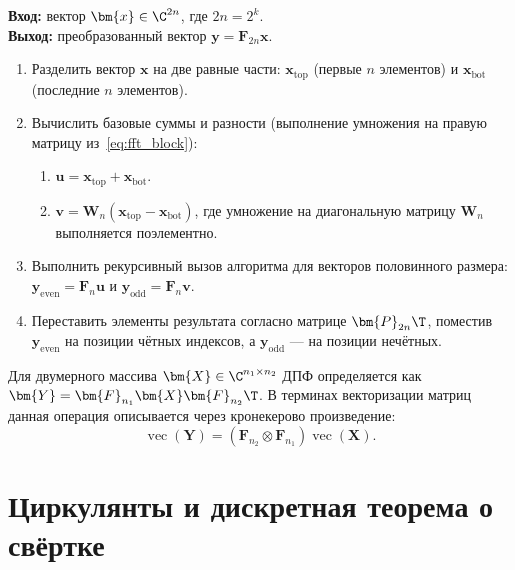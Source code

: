 \begin{tcbalgorithmbox}
\label{alg:fft}
    \textbf{Вход:} вектор $\bm{x} \in \C^{2n}$, где $2n = 2^k$.\\
    \textbf{Выход:} преобразованный вектор $\bm{y} = \bm{F}_{2n} \bm{x}$.
    \begin{enumerate}
        \item Разделить вектор $\bm{x}$ на две равные части: $\bm{x}_{\text{top}}$ (первые $n$ элементов) и $\bm{x}_{\text{bot}}$ (последние $n$ элементов).
        \item Вычислить базовые суммы и разности (выполнение умножения на правую матрицу из~\cref{eq:fft_block}):
        \begin{enumerate}
            \item $\bm{u} = \bm{x}_{\text{top}} + \bm{x}_{\text{bot}}$.
            \item $\bm{v} = \bm{W}_n (\bm{x}_{\text{top}} - \bm{x}_{\text{bot}})$, где умножение на диагональную матрицу $\bm{W}_n$ выполняется поэлементно.
        \end{enumerate}
        \item Выполнить рекурсивный вызов алгоритма для векторов половинного размера:
              $\bm{y}_{\text{even}} = \bm{F}_n \bm{u}$ и $\bm{y}_{\text{odd}} = \bm{F}_n \bm{v}$.
        \item Переставить элементы результата согласно матрице $\bm{P}_{2n}\T$, поместив $\bm{y}_{\text{even}}$ на позиции чётных индексов, а $\bm{y}_{\text{odd}}$ --- на позиции нечётных.
    \end{enumerate}
\end{tcbalgorithmbox}

\begin{tcbinsight}
    Для двумерного массива $\bm{X} \in \C^{n_1 \times n_2}$ ДПФ определяется как $\bm{Y} = \bm{F}_{n_1} \bm{X} \bm{F}_{n_2}\T$. В терминах векторизации матриц данная операция описывается через кронекерово произведение:
    \[
        \operatorname{vec}(\bm{Y}) = (\bm{F}_{n_2} \otimes \bm{F}_{n_1}) \operatorname{vec}(\bm{X}).
    \]
\end{tcbinsight}

\section{Циркулянты и дискретная теорема о свёртке}
\label{sec:circulant}


